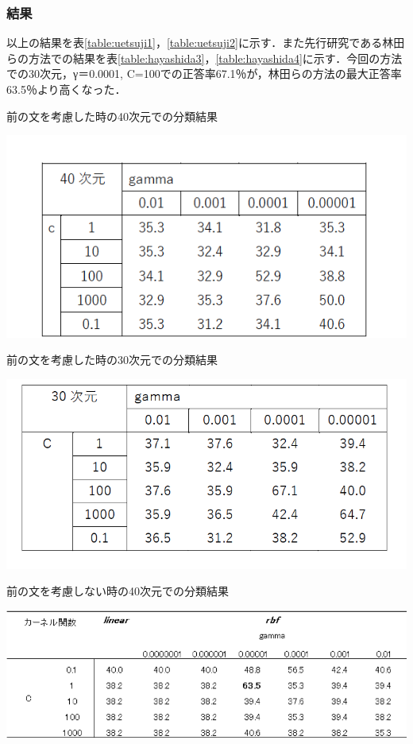 \documentclass[shuuron]{kuee}
\begin{document}
\subsubsection{結果}
以上の結果を表\ref{table:uetsuji1}，\ref{table:uetsuji2}に示す．また先行研究である林田らの方法での結果を表\ref{table:hayashida3}，\ref{table:hayashida4}に示す．今回の方法での30次元，γ＝0.0001, C=100での正答率67.1％が，林田らの方法の最大正答率63.5％より高くなった．

\begin{table}
  \caption{前の文を考慮した時の40次元での分類結果}
  \label{table:uetsuji1}
  \begin{center}
    \includegraphics[width=\linewidth]{uetsuji1.png}
  \end{center}
\end{table}

\begin{table}
  \caption{前の文を考慮した時の30次元での分類結果}
  \label{table:uetsuji2}
  \begin{center}
    \includegraphics[width=\linewidth]{uetsuji2.png}
  \end{center}
\end{table}

\begin{table}
  \caption{前の文を考慮しない時の40次元での分類結果}
  \label{table:hayashida3}
  \begin{center}
    \includegraphics[width=\linewidth]{hayashida3.png}
  \end{center}
\end{table}
\end{document}
